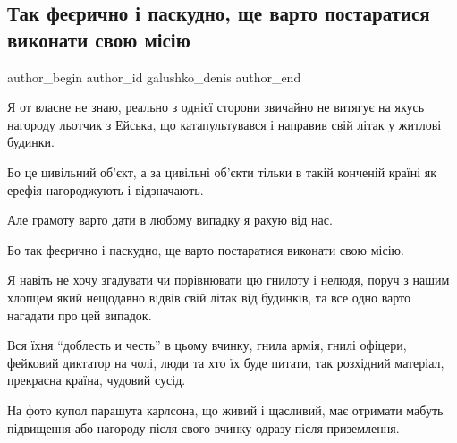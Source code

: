  
 
 
 
 

\subsection{Так феєрично і паскудно, ще варто постаратися виконати свою місію}
\label{sec:17_10_2022.fb.galushko_denis.2.tak_fe_richno___pask}

\ifcmt
 author_begin
   author_id galushko_denis
 author_end
\fi

Я от власне не знаю, реально з однієї сторони звичайно не витягує на якусь
нагороду льотчик з Ейська, що катапультувався і направив свій літак у житлові
будинки.

Бо це цивільний об'єкт, а за цивільні об'єкти тільки в такій конченій країні як
ерефія нагороджують і відзначають.

Але грамоту варто дати в любому випадку я рахую від нас.

Бо так феєрично і паскудно, ще варто постаратися виконати свою місію.

Я навіть не хочу згадувати чи порівнювати цю гнилоту і нелюдя, поруч з нашим
хлопцем який нещодавно відвів свій літак від будинків, та все одно варто
нагадати про цей випадок. 

Вся їхня \enquote{доблесть и честь} в цьому вчинку, гнила армія, гнилі офіцери,
фейковий диктатор на чолі, люди та хто їх буде питати, так розхідний матеріал,
прекрасна країна, чудовий сусід.

На фото купол парашута карлсона, що живий і щасливий, має отримати мабуть
підвищення або нагороду після свого вчинку одразу після приземлення.
